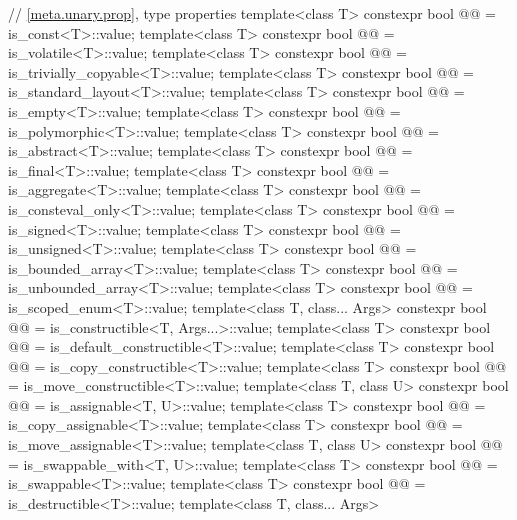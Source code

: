 \begin{codeblock}
{  // \ref{meta.unary.prop}, type properties
  template<class T>
    constexpr bool @@ = is_const<T>::value;
  template<class T>
    constexpr bool @@ = is_volatile<T>::value;
  template<class T>
    constexpr bool @@ = is_trivially_copyable<T>::value;
  template<class T>
    constexpr bool @@ = is_standard_layout<T>::value;
  template<class T>
    constexpr bool @@ = is_empty<T>::value;
  template<class T>
    constexpr bool @@ = is_polymorphic<T>::value;
  template<class T>
    constexpr bool @@ = is_abstract<T>::value;
  template<class T>
    constexpr bool @@ = is_final<T>::value;
  template<class T>
    constexpr bool @@ = is_aggregate<T>::value;
  template<class T>
    constexpr bool @@ = is_consteval_only<T>::value;
  template<class T>
    constexpr bool @@ = is_signed<T>::value;
  template<class T>
    constexpr bool @@ = is_unsigned<T>::value;
  template<class T>
    constexpr bool @@ = is_bounded_array<T>::value;
  template<class T>
    constexpr bool @@ = is_unbounded_array<T>::value;
  template<class T>
    constexpr bool @@ = is_scoped_enum<T>::value;
  template<class T, class... Args>
    constexpr bool @@ = is_constructible<T, Args...>::value;
  template<class T>
    constexpr bool @@ = is_default_constructible<T>::value;
  template<class T>
    constexpr bool @@ = is_copy_constructible<T>::value;
  template<class T>
    constexpr bool @@ = is_move_constructible<T>::value;
  template<class T, class U>
    constexpr bool @@ = is_assignable<T, U>::value;
  template<class T>
    constexpr bool @@ = is_copy_assignable<T>::value;
  template<class T>
    constexpr bool @@ = is_move_assignable<T>::value;
  template<class T, class U>
    constexpr bool @@ = is_swappable_with<T, U>::value;
  template<class T>
    constexpr bool @@ = is_swappable<T>::value;
  template<class T>
    constexpr bool @@ = is_destructible<T>::value;
  template<class T, class... Args>
}
\end{codeblock}
